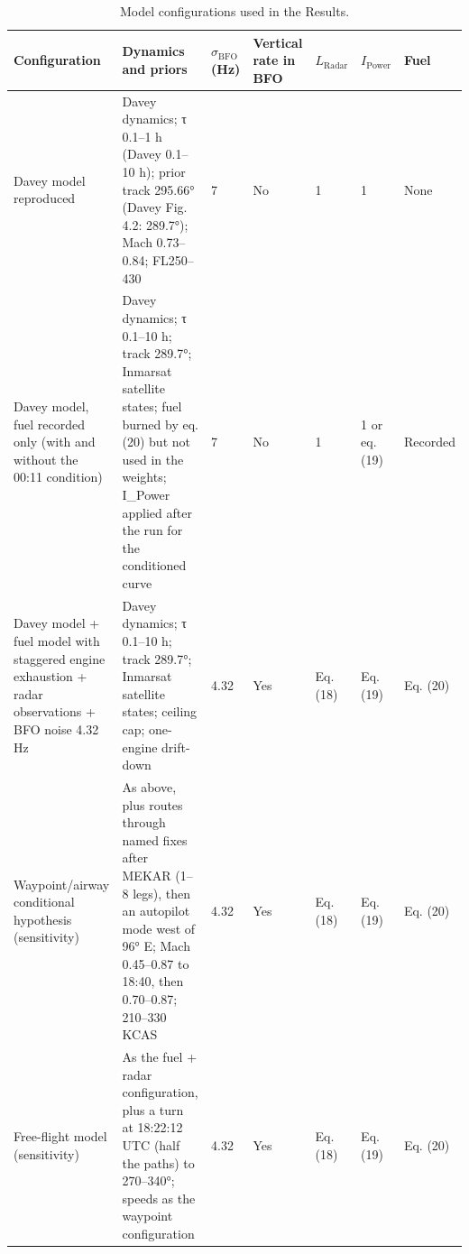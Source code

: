 \begin{table}[h]
\caption{Model configurations used in the Results.}
\small
\begin{tabular}{p{2.6cm}p{4.2cm}p{0.8cm}p{0.9cm}p{0.9cm}p{1.0cm}p{0.9cm}}
\hline
Configuration & Dynamics and priors & $\sigma_{\mathrm{BFO}}$ (Hz) & Vertical rate in BFO & $L_{\mathrm{Radar}}$ & $I_{\mathrm{Power}}$ & Fuel \\
\hline
Davey model reproduced & Davey dynamics; τ 0.1–1 h (Davey 0.1–10 h); prior track 295.66° (Davey Fig. 4.2: 289.7°); Mach 0.73–0.84; FL250–430 & 7 & No & 1 & 1 & None \\
Davey model, fuel recorded only (with and without the 00:11 condition) & Davey dynamics; τ 0.1–10 h; track 289.7°; Inmarsat satellite states; fuel burned by eq. (20) but not used in the weights; I\_Power applied after the run for the conditioned curve & 7 & No & 1 & 1 or eq. (19) & Recorded \\
Davey model + fuel model with staggered engine exhaustion + radar observations + BFO noise 4.32 Hz & Davey dynamics; τ 0.1–10 h; track 289.7°; Inmarsat satellite states; ceiling cap; one-engine drift-down & 4.32 & Yes & Eq. (18) & Eq. (19) & Eq. (20) \\
Waypoint/airway conditional hypothesis (sensitivity) & As above, plus routes through named fixes after MEKAR (1–8 legs), then an autopilot mode west of 96° E; Mach 0.45–0.87 to 18:40, then 0.70–0.87; 210–330 KCAS & 4.32 & Yes & Eq. (18) & Eq. (19) & Eq. (20) \\
Free-flight model (sensitivity) & As the fuel + radar configuration, plus a turn at 18:22:12 UTC (half the paths) to 270–340°; speeds as the waypoint configuration & 4.32 & Yes & Eq. (18) & Eq. (19) & Eq. (20) \\
\hline
\end{tabular}
\end{table}